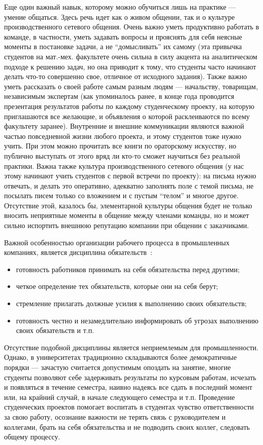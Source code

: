 \documentclass[a4paper]{article}
\begin{document}
Еще один важный навык, которому можно обучиться лишь на практике --- умение общаться. Здесь речь идет как о живом общении, так и о культуре производственного сетевого общения.  Очень важно уметь продуктивно работать в команде, в частности, уметь задавать вопросы и прояснять для себя неясные моменты в постановке задачи, а не ``домысливать'' их самому (эта привычка студентов на мат.-мех. факультете очень сильна в силу акцента на аналитическом подходе к решению задач, но она приводит к тому, что студенты часто начинают делать что-то совершенно свое, отличное от исходного задания). Также важно уметь рассказать о своей работе самым разным людям --- начальству, товарищам, независимым экспертам (как упоминалось ранее, в конце года проводится презентация результатов работы по каждому студенческому проекту, на которую приглашаются все желающие, и объявления о которой расклеиваются по всему факультету заранее). Внутренние и внешние коммуникации являются важной частью повседневной жизни любого проекта, и этому студентов тоже нужно учить. При этом можно прочитать все книги по ораторскому искусству, но публично выступать от этого вряд ли кто-то сможет научиться без реальной практики. Важна также культура производственного сетевого общения (у нас этому начинают учить студентов с первой встречи по проекту): на письма нужно отвечать, и делать это оперативно, адекватно заполнять поле с темой письма, не посылать писем только со вложением и с пустым ``телом'' и многое другое. Отсутствие этой, казалось бы, элементарной культуры общения будет не только вносить неприятные моменты в общение между членами команды, но и может сильно испортить внешнюю репутацию компании при общении с заказчиками.

Важной особенностью организации рабочего процесса в промышленных компаниях, является дисциплина обязательств~\cite{obyzat}:
\begin{itemize}
 \item готовность работников принимать на себя обязательства перед другими;
 \item четкое определение тех обязательств, которые они на себя берут;
 \item стремление прилагать должные усилия к выполнению своих обязательств;
 \item готовность честно и незамедлительно информировать об угрозах выполнению своих обязательств и т.п.
\end{itemize}
Отсутствие подобной дисциплины является неприемлемым для промышленности. Однако, в университетах традиционно складываются более демократичные порядки --- зачастую считается допустимым опоздать на занятие, многие студенты позволяют себе задерживать результаты по курсовым работам, исчезать и появляться в течение семестра, наивно надеясь все сдать в последний момент или, на крайний случай, в начале следующего семестра и т.п. Проведение студенческих проектов помогает воспитать в студентах чувство ответственности за свою работу, осознание важности не терять связь с руководителем и коллегами, брать на себя обязательства и не подводить своих коллег, следовать общему процессу.
\end{document}
